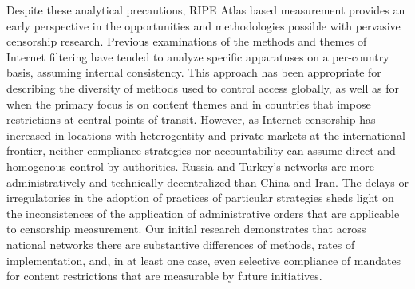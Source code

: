 Despite these analytical precautions, RIPE Atlas based measurement provides an early perspective in the opportunities and methodologies possible with pervasive censorship research. Previous examinations of the methods and themes of Internet filtering have tended to analyze specific apparatuses on a per-country basis, assuming internal consistency. This approach has been appropriate for describing the diversity of methods used to control access globally, as well as for when the primary focus is on content themes and in countries that impose restrictions at central points of transit. However, as Internet censorship has increased in locations with heterogentity and private markets at the international frontier, neither compliance strategies nor accountability can assume direct and homogenous control by authorities. Russia and Turkey's networks are more administratively and technically decentralized than China and Iran. The delays or irregulatories in the adoption of practices of particular strategies sheds light on the inconsistences of the application of administrative orders that are applicable to censorship measurement. Our initial research demonstrates that across national networks there are substantive differences of methods, rates of implementation, and, in at least one case, even selective compliance of mandates for content restrictions that are measurable by future initiatives.
